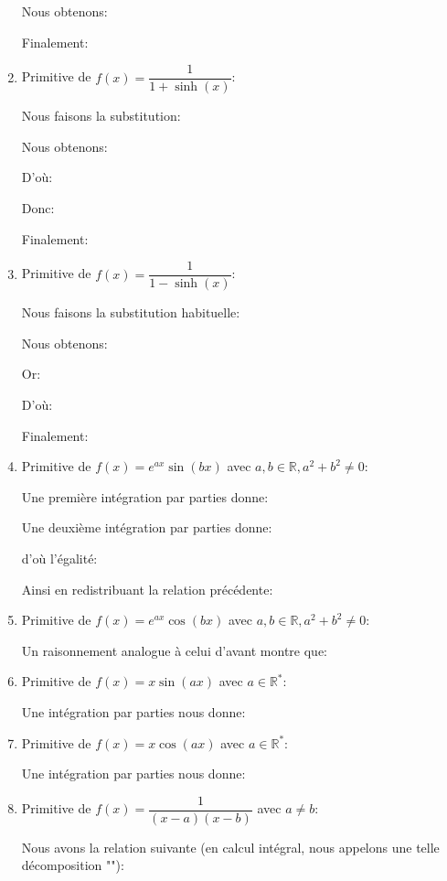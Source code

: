 \begin{enumerate}
		Nous obtenons:
		
		Finalement:
		
		
		\item Primitive de $f(x)=\dfrac{1}{1+\sinh(x)}$:
		
		Nous faisons la substitution:
		
		Nous obtenons: 
		
		D'où:
		
		Donc:
		
		Finalement:
		
		
		\item Primitive de $f(x)=\dfrac{1}{1-\sinh(x)}$:
		
		Nous faisons la substitution habituelle:
		
		Nous obtenons: 
		
		Or:
		
		D'où:
		
		Finalement:
		
		
		\item Primitive de $f(x)=e^{ax}\sin(bx)$ avec $a,b\in \mathbb{R},a^2+b^2\neq 0$:
		
		Une première intégration par parties donne:
		
		Une deuxième intégration par parties donne:
		
		d'où l'égalité:
		
		Ainsi en redistribuant la relation précédente: 
		
		
		\item Primitive de $f(x)=e^{ax}\cos(bx)$ avec $a,b\in \mathbb{R},a^2+b^2\neq 0$:
		
		Un raisonnement analogue à celui d'avant montre que:
		
		
		\item Primitive de $f(x)=x\sin(ax)$ avec $a \in \mathbb{R}^*$:
		
		Une intégration par parties nous donne:
		
		
		\item Primitive de $f(x)=x\cos(ax)$ avec $a \in \mathbb{R}^*$:
		
		Une intégration par parties nous donne:
		
		
		\item Primitive de $f(x)=\dfrac{1}{(x-a)(x-b)}$ avec $a \neq b$:
		
		Nous avons la relation suivante (en calcul intégral, nous appelons une telle décomposition ""):
		

\end{enumerate}
